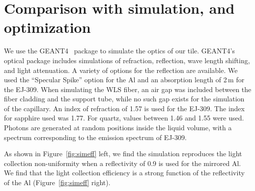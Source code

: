 \documentclass[review]{elsarticle}
\begin{document}
\section{Comparison with simulation, and optimization}
We use the GEANT4~\cite{Agostinelli2003250} package to simulate the
optics of our tile. GEANT4's optical package includes simulations of
refraction, reflection, wave length shifting, and light attenuation.
A variety of options for the reflection are available. We used the
``Specular Spike'' option for the Al and an absorption length of 2\,m for
the EJ-309. When simulating the WLS fiber, an air gap was included
between the fiber cladding and the support tube, while no such gap
exists for the simulation of the capillary. An index of refraction of
1.57 is used for the EJ-309. The index for sapphire used was 1.77.
For quartz, values between 1.46 and 1.55 were used. Photons are
generated at random positions inside the liquid volume, with a
spectrum corresponding to the emission spectrum of EJ-309.

As shown in Figure~\ref{fig:simeff} left, we find the simulation
reproduces the light collection non-uniformity when a reflectivity of
0.9 is used for the mirrored Al.
We find that the light collection efficiency is a strong function of
the reflectivity of the Al (Figure~\ref{fig:simeff} right).
\end{document}
